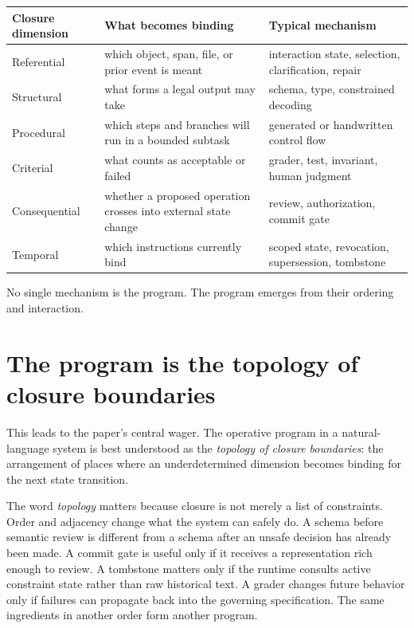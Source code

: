 \documentclass[11pt]{article}
\begin{document}
\begin{center}
\small
\begin{tabular}{>{\raggedright\arraybackslash}p{} >{\raggedright\arraybackslash}p{} >{\raggedright\arraybackslash}p{}}
\toprule
Closure dimension & What becomes binding & Typical mechanism \\
\midrule
Referential & which object, span, file, or prior event is meant & interaction state, selection, clarification, repair \\
Structural & what forms a legal output may take & schema, type, constrained decoding \\
Procedural & which steps and branches will run in a bounded subtask & generated or handwritten control flow \\
Criterial & what counts as acceptable or failed & grader, test, invariant, human judgment \\
Consequential & whether a proposed operation crosses into external state change & review, authorization, commit gate \\
Temporal & which instructions currently bind & scoped state, revocation, supersession, tombstone \\
\bottomrule
\end{tabular}
\end{center}

No single mechanism is the program. The program emerges from their ordering and interaction.

\section{The program is the topology of closure boundaries}
This leads to the paper's central wager. The operative program in a natural-language system is best understood as the \emph{topology of closure boundaries}: the arrangement of places where an underdetermined dimension becomes binding for the next state transition.

The word \emph{topology} matters because closure is not merely a list of constraints. Order and adjacency change what the system can safely do. A schema before semantic review is different from a schema after an unsafe decision has already been made. A commit gate is useful only if it receives a representation rich enough to review. A tombstone matters only if the runtime consults active constraint state rather than raw historical text. A grader changes future behavior only if failures can propagate back into the governing specification. The same ingredients in another order form another program.
\end{document}
